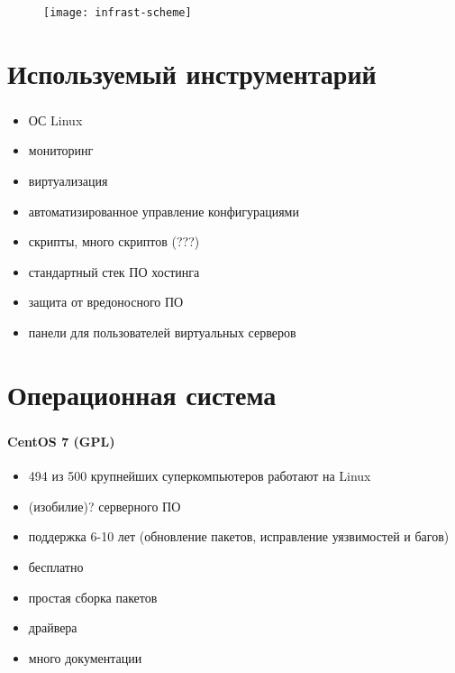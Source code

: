 \begin{frame}
\frametitle{\insertsection}
\begin{figure}[h]
	\begin{center}
		\texttt{[image: infrast-scheme]}
	\end{center}
\end{figure}
\end{frame}


\section{Используемый инструментарий}

\begin{frame}
\frametitle{\insertsection}
\begin{itemize}
	\item ОС Linux
	\item мониторинг
	\item виртуализация
	\item автоматизированное управление конфигурациями
	\item скрипты, много скриптов (???)
	\item стандартный стек ПО хостинга
	\item защита от вредоносного ПО
	\item панели для пользователей виртуальных серверов
\end{itemize}
\end{frame}


\section{Операционная система}

\begin{frame}
\frametitle{\insertsection}
\framesubtitle{CentOS 7 (GPL)}
\begin{itemize}
	\item 494 из 500 крупнейших суперкомпьютеров работают на Linux
	\item (изобилие)? серверного ПО
	\item поддержка 6-10 лет (обновление пакетов, исправление уязвимостей и багов)
	\item бесплатно
	\item простая сборка пакетов
	\item драйвера
	\item много документации
\end{itemize}
\end{frame}

